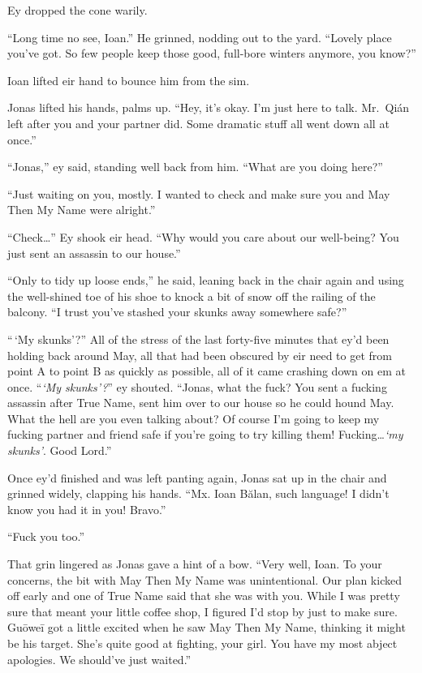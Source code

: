 Ey dropped the cone warily.

``Long time no see, Ioan.'' He grinned, nodding out to the yard. ``Lovely place you've got. So few people keep those good, full-bore winters anymore, you know?''

Ioan lifted eir hand to bounce him from the sim.

Jonas lifted his hands, palms up. ``Hey, it's okay. I'm just here to talk. Mr.~Qián left after you and your partner did. Some dramatic stuff all went down all at once.''

``Jonas,'' ey said, standing well back from him. ``What are you doing here?''

``Just waiting on you, mostly. I wanted to check and make sure you and May Then My Name were alright.''

``Check\ldots{}'' Ey shook eir head. ``Why would you care about our well-being? You just sent an assassin to our house.''

``Only to tidy up loose ends,'' he said, leaning back in the chair again and using the well-shined toe of his shoe to knock a bit of snow off the railing of the balcony. ``I trust you've stashed your skunks away somewhere safe?''

``\,`My skunks'?'' All of the stress of the last forty-five minutes that ey'd been holding back around May, all that had been obscured by eir need to get from point A to point B as quickly as possible, all of it came crashing down on em at once. ``\emph{`My skunks'?}'' ey shouted. ``Jonas, what the fuck? You sent a fucking assassin after True Name, sent him over to our house so he could hound May. What the hell are you even talking about? Of course I'm going to keep my fucking partner and friend safe if you're going to try killing them! Fucking\ldots{}\emph{`my skunks'}. Good Lord.''

Once ey'd finished and was left panting again, Jonas sat up in the chair and grinned widely, clapping his hands. ``Mx. Ioan Bălan, such language! I didn't know you had it in you! Bravo.''

``Fuck you too.''

That grin lingered as Jonas gave a hint of a bow. ``Very well, Ioan. To your concerns, the bit with May Then My Name was unintentional. Our plan kicked off early and one of True Name said that she was with you. While I was pretty sure that meant your little coffee shop, I figured I'd stop by just to make sure. Guōweī got a little excited when he saw May Then My Name, thinking it might be his target. She's quite good at fighting, your girl. You have my most abject apologies. We should've just waited.''

